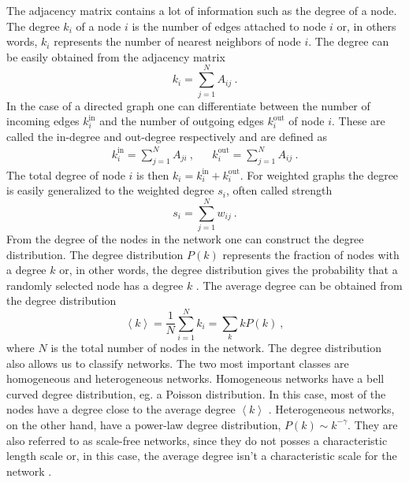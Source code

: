 \documentclass[11 pt , letterpaper , twoside , openright]{book}
\begin{document}
The adjacency matrix contains a lot of information such as the degree of a node. The degree $k_i$ of a node $i$ is the number of edges attached to node $i$ or, in others words, $k_i$ represents the number of nearest neighbors of node $i$. The degree can be easily obtained from the adjacency matrix \cite{Mata2020}
\begin{equation}
	k_i = \sum_{j=1}^N A_{ij}\ .
\end{equation}
In the case of a directed graph one can differentiate between the number of incoming edges $k_i^{\textrm{in}}$ and the number of outgoing edges $k_i^{\textrm{out}}$ of node $i$. These are called the in-degree and out-degree respectively and are defined as \cite{Mata2020}
\begin{align}
	k_i^{\text{in}} = \sum_{j=1}^N A_{ji} \ , && k_i^{\text{out}} = \sum_{j=1}^N A_{ij} \ .
\end{align}
The total degree of node $i$ is then $k_i = k_i^{\text{in}} + k_i^{\text{out}}$. For weighted graphs the degree is easily generalized to the weighted degree $s_i$, often called strength \cite{Ioannis2007}
\begin{equation}
	s_i = \sum_{j=1}^N w_{ij} \ .
\end{equation}
From the degree of the nodes in the network one can construct the degree distribution. The degree distribution $P(k)$ represents the fraction of nodes with a degree $k$ or, in other words, the degree distribution gives the probability that a randomly selected node has a degree $k$ \cite{Newman2003}. The average degree can be obtained from the degree distribution \cite{Mata2020}
\begin{equation}
	\left<k\right> = \frac{1}{N} \sum_{i=1}^N k_i = \sum_k k P(k) \ ,
\end{equation}
where $N$ is the total number of nodes in the network. The degree distribution also allows us to classify networks. The two most important classes are homogeneous and heterogeneous networks. Homogeneous networks have a bell curved degree distribution, eg. a Poisson distribution. In this case, most of the nodes have a degree close to the average degree $\left<k\right>$ \cite{Barabasi2016}. Heterogeneous networks, on the other hand, have a power-law degree distribution, $P(k) \sim k^{-\gamma}$. They are also referred to as scale-free networks, since they do not posses a characteristic length scale or, in this case, the average degree isn't a characteristic scale for the network \cite{Barabasi2016}\cite{Mata2020}.
\end{document}
